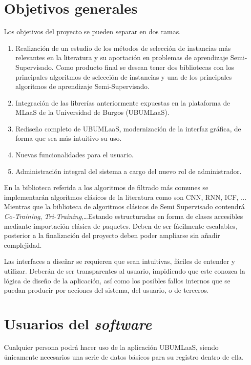 \section{Objetivos generales}\label{objetivos-generales}
Los objetivos del proyecto se pueden separar en dos ramas.
\begin{enumerate}
\item Realización de un estudio de los métodos de selección de instancias más relevantes en la literatura y su aportación en problemas de aprendizaje Semi-Supervisado. Como producto final se desean tener dos bibliotecas con los principales algoritmos de selección de instancias y una de los principales algoritmos de aprendizaje Semi-Supervisado.
\item Integración de las librerías anteriormente expuestas en la plataforma de MLaaS de la Universidad de Burgos (UBUMLaaS).
\item Rediseño completo de UBUMLaaS, modernización de la interfaz gráfica, de forma que sea más intuitivo su uso.
\item Nuevas funcionalidades para el usuario.
\item Administración integral del sistema a cargo del nuevo rol de administrador.
\end{enumerate}

En la biblioteca referida a los algoritmos de filtrado más comunes se implementarán algoritmos clásicos de la literatura como son CNN, RNN, ICF, ... Mientras que la biblioteca de algoritmos clásicos de Semi Supervisado contendrá \textit{Co-Training}, \textit{Tri-Training},\dots Estando estructuradas en forma de clases accesibles mediante importación clásica de paquetes. Deben de ser fácilmente escalables, posterior a la finalización del proyecto deben poder ampliarse sin añadir complejidad.

Las interfaces a diseñar se requieren que sean intuitivas, fáciles de entender y utilizar. Deberán de ser transparentes al usuario, impidiendo que este conozca la lógica de diseño de la aplicación, así como los posibles fallos internos que se puedan producir por acciones del sistema, del usuario, o de terceros.


\section{Usuarios del \textit{software}}\label{usuarios-participantes}
Cualquier persona podrá hacer uso de la aplicación UBUMLaaS, siendo únicamente necesarios una serie de datos básicos para su registro dentro de ella. 

